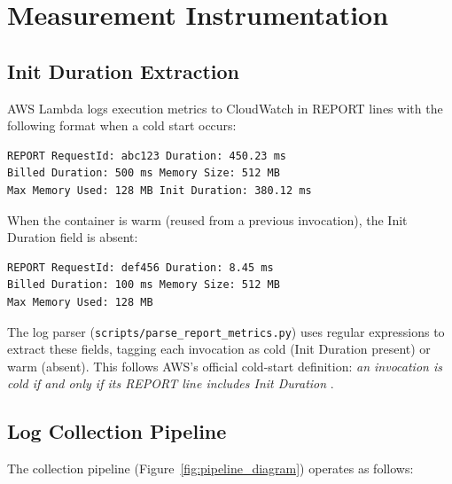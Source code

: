 \section{Measurement Instrumentation}

\subsection{Init Duration Extraction}

AWS Lambda logs execution metrics to CloudWatch in REPORT lines with the following format when a cold start occurs:

\begin{verbatim}
REPORT RequestId: abc123 Duration: 450.23 ms 
Billed Duration: 500 ms Memory Size: 512 MB 
Max Memory Used: 128 MB Init Duration: 380.12 ms
\end{verbatim}

When the container is warm (reused from a previous invocation), the Init Duration field is absent:

\begin{verbatim}
REPORT RequestId: def456 Duration: 8.45 ms 
Billed Duration: 100 ms Memory Size: 512 MB 
Max Memory Used: 128 MB
\end{verbatim}

The log parser (\texttt{scripts/parse\_report\_metrics.py}) uses regular expressions to extract these fields, tagging each invocation as cold (Init Duration present) or warm (absent). This follows AWS's official cold-start definition: \textit{an invocation is cold if and only if its REPORT line includes Init Duration} \citep{bluemke2025ijet}.

\subsection{Log Collection Pipeline}

The collection pipeline (Figure~\ref{fig:pipeline_diagram}) operates as follows:

